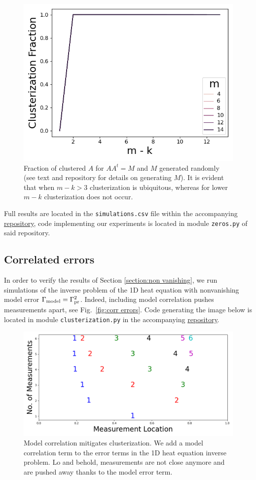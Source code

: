 \begin{figure}
    \centering
    \includegraphics[height=0.5\textwidth]{simulations.png}
    \caption{Fraction of clustered $A$ for $AA^t = M$ and $M$
      generated randomly (see text and repository for details on
      generating $M$). It is evident that when $m-k >3$ clusterization
      is ubiquitous, whereas for lower $m-k$ clusterization does not
      occur.}
  \label{fig:sim AAt}
\end{figure}

Full results are located in the \texttt{simulations.csv} file within
the accompanying \href{https://github.com/yairdaon/OED}{repository},
code implementing our experiments is located in module
\texttt{zeros.py} of said repository.


\subsection{Correlated errors}\label{subsec:corr errors sims}
In order to verify the results of Section \ref{section:non vanishing},
we run simulations of the inverse problem of the 1D heat equation with
nonvanishing model error \(\Gamma_{\textup{model}} = \Gamma_{\textup{pr}}^2 \). Indeed, including model
correlation pushes measurements apart, see Fig.~\ref{fig:corr
  errors}. Code generating the image below is located in module
\texttt{clusterization.py} in the accompanying
\href{https://github.com/yairdaon/OED}{repository}.

\begin{figure}
    \centering
    \includegraphics[height=0.5\textwidth]{dst_modelError4.png}
    \caption{Model correlation mitigates clusterization. We add a
      model correlation term to the error terms in the 1D heat
      equation inverse problem. Lo and behold, measurements are not
      close anymore and are pushed away thanks to the model error
      term.}
  \label{fig:corr errors}
\end{figure}
